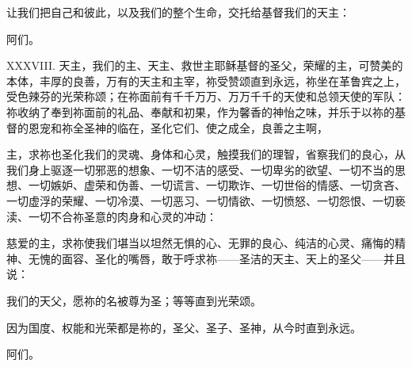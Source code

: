 让我们把自己和彼此，以及我们的整个生命，交托给基督我们的天主：\par

\par

阿们。\par

\par

XXXVIII. 天主，我们的主、天主、救世主耶稣基督的圣父，荣耀的主，可赞美的本体，丰厚的良善，万有的天主和主宰，祢受赞颂直到永远，祢坐在革鲁宾之上，受色辣芬的光荣称颂；在祢面前有千千万万、万万千千的天使和总领天使的军队：祢收纳了奉到祢面前的礼品、奉献和初果，作为馨香的神怡之味，并乐于以祢的基督的恩宠和祢全圣神的临在，圣化它们、使之成全，良善之主啊，\par

主，求祢也圣化我们的灵魂、身体和心灵，触摸我们的理智，省察我们的良心，从我们身上驱逐一切邪恶的想象、一切不洁的感受、一切卑劣的欲望、一切不当的思想、一切嫉妒、虚荣和伪善、一切谎言、一切欺诈、一切世俗的情感、一切贪吝、一切虚浮的荣耀、一切冷漠、一切恶习、一切情欲、一切愤怒、一切怨恨、一切亵渎、一切不合祢圣意的肉身和心灵的冲动：\par

\par

慈爱的主，求祢使我们堪当以坦然无惧的心、无罪的良心、纯洁的心灵、痛悔的精神、无愧的面容、圣化的嘴唇，敢于呼求祢——圣洁的天主、天上的圣父——并且说：\par

\par

我们的天父，愿祢的名被尊为圣；等等直到光荣颂。\par

\par

\par

\par

因为国度、权能和光荣都是祢的，圣父、圣子、圣神，从今时直到永远。\par

\par

阿们。\par

